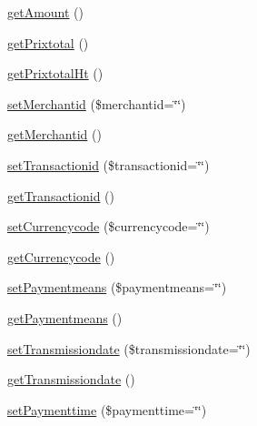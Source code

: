 \begin{DoxyCompactItemize}
\item 
\hyperlink{class_acme_group_1_1_labo_bundle_1_1_entity_1_1facture_ac32d0111806d3754468c7c132fc247c0}{get\+Amount} ()
\item 
\hyperlink{class_acme_group_1_1_labo_bundle_1_1_entity_1_1facture_a434bd155a141e8625274ed934c11a84f}{get\+Prixtotal} ()
\item 
\hyperlink{class_acme_group_1_1_labo_bundle_1_1_entity_1_1facture_a13d55eff26d91509d852eee93c3bc0cb}{get\+Prixtotal\+Ht} ()
\item 
\hyperlink{class_acme_group_1_1_labo_bundle_1_1_entity_1_1facture_a8affee7501e82e1ae74dd2bcc7da2311}{set\+Merchantid} (\$merchantid=\char`\"{}\char`\"{})
\item 
\hyperlink{class_acme_group_1_1_labo_bundle_1_1_entity_1_1facture_a3e918bb5019d94d97a1e4be776d83665}{get\+Merchantid} ()
\item 
\hyperlink{class_acme_group_1_1_labo_bundle_1_1_entity_1_1facture_a1e3adf30e2d3cf07ef5dc43c7f952c1d}{set\+Transactionid} (\$transactionid=\char`\"{}\char`\"{})
\item 
\hyperlink{class_acme_group_1_1_labo_bundle_1_1_entity_1_1facture_a743cff7562cf75b7fcbf0b0808b61220}{get\+Transactionid} ()
\item 
\hyperlink{class_acme_group_1_1_labo_bundle_1_1_entity_1_1facture_aba5358ed943622af10a0ad0f5681bd46}{set\+Currencycode} (\$currencycode=\char`\"{}\char`\"{})
\item 
\hyperlink{class_acme_group_1_1_labo_bundle_1_1_entity_1_1facture_a876da346742ea2193cc7bef0178d5184}{get\+Currencycode} ()
\item 
\hyperlink{class_acme_group_1_1_labo_bundle_1_1_entity_1_1facture_a24f981cb17da328e4b62a4f768f0a99a}{set\+Paymentmeans} (\$paymentmeans=\char`\"{}\char`\"{})
\item 
\hyperlink{class_acme_group_1_1_labo_bundle_1_1_entity_1_1facture_ac0c3676a39f53bd4f40147f33f9ecaed}{get\+Paymentmeans} ()
\item 
\hyperlink{class_acme_group_1_1_labo_bundle_1_1_entity_1_1facture_a4e096ec129f0f7a9d37587b79ff3f88c}{set\+Transmissiondate} (\$transmissiondate=\char`\"{}\char`\"{})
\item 
\hyperlink{class_acme_group_1_1_labo_bundle_1_1_entity_1_1facture_ac2572f96aaabce0fa4dd00f7f30a2799}{get\+Transmissiondate} ()
\item 
\hyperlink{class_acme_group_1_1_labo_bundle_1_1_entity_1_1facture_a6854cbdaf677165bcf7471811d4c7670}{set\+Paymenttime} (\$paymenttime=\char`\"{}\char`\"{})
\item 

\end{DoxyCompactItemize}

